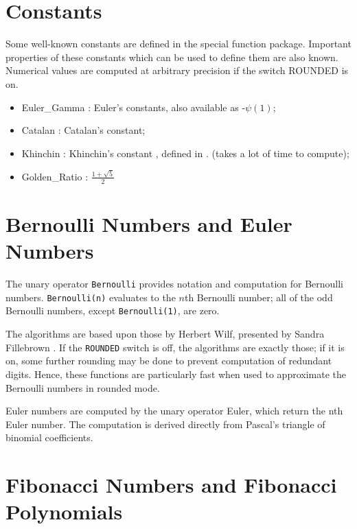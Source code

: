 \section{Constants}

Some well-known constants are defined in the special function package.
Important properties of these constants which can be used to define them
are also known. Numerical values are computed  at arbitrary precision
if the switch ROUNDED is on.

\begin{itemize}
\item Euler\_Gamma : Euler's constants, also available as -$\psi(1)$;
\item Catalan : Catalan's constant;
\item Khinchin : Khinchin's constant , defined in  \cite{Khinchin:64}.
 (takes a lot of time to compute);
\item Golden\_Ratio : $\frac{1 + \sqrt{5}}{2}$ 
\end{itemize}


\section{Bernoulli Numbers and Euler Numbers}

The unary operator {\tt Bernoulli} provides notation and computation for
Bernoulli numbers.  {\tt Bernoulli(n)} evaluates to the $n$th Bernoulli
number; all of the odd Bernoulli numbers, except {\tt Bernoulli(1)}, are
zero.

The algorithms are based upon those by Herbert Wilf, presented by Sandra
Fillebrown \cite{Fillebrown:92}.  If the {\tt ROUNDED} switch is off,
the algorithms are exactly those; if it is on, some further rounding may
be done to prevent computation of redundant digits.  Hence, these
functions are particularly fast when used to approximate the Bernoulli
numbers in rounded mode.

Euler numbers are computed by the unary operator Euler, which
return the nth Euler number. The computation is derived 
directly from Pascal's triangle of binomial coefficients.
 

\section{Fibonacci Numbers and Fibonacci Polynomials}

